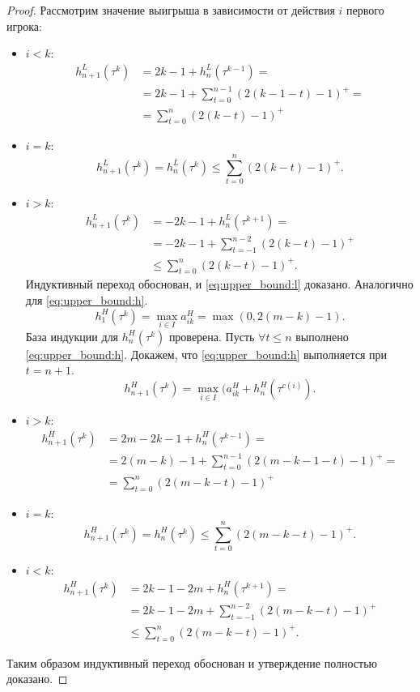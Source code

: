 \begin{proof}
Рассмотрим значение выигрыша в зависимости от действия $ i $ первого игрока:
\begin{itemize}
\item
    $ i < k $:
    \begin{align*}
    h_{n+1}^L(\tau^k) &= 2k - 1 + h_n^L(\tau^{k-1}) = \\
    &= 2k - 1 + \sum_{t = 0}^{n-1}(2(k-1-t)-1)^+ = \\
    &= \sum_{t = 0}^n (2(k-t) - 1)^+
    \end{align*}
\item
    $ i = k $:
    \[
    h_{n+1}^L(\tau^k) = h_n^L(\tau^k) \leq \sum_{t=0}^n(2(k-t)-1)^+.
    \]
\item
    $ i > k $:
    \begin{align*}
    h_{n+1}^L(\tau^k) &= -2k - 1 + h_n^L(\tau^{k+1}) = \\
    &= -2k - 1 + \sum_{t = -1}^{n-2} (2(k-t)-1)^+ \\
    &\leq \sum_{t=0}^n(2(k-t)-1)^+.
    \end{align*}
    Индуктивный переход обоснован, и \eqref{eq:upper_bound:l} доказано.
    Аналогично для \eqref{eq:upper_bound:h}.
    \[
    h_1^H(\tau^k) = \max_{i \in I} a_{ik}^H = \max(0, 2(m - k) - 1).
    \]
    База индукции для $ h_n^H(\tau^k) $ проверена.
    Пусть $ \forall t \leq n $ выполнено \eqref{eq:upper_bound:h}. Докажем, что \eqref{eq:upper_bound:h} выполняется при $ t = n + 1 $.
    \[
    h_{n+1}^H(\tau^k) = \max_{i \in I}(a_{ik}^H + h_n^H(\tau^{c(i)}).
    \]
\item
    $ i > k $:
    \begin{align*}
    h_{n+1}^H(\tau^k) &= 2m - 2k - 1 + h_n^H(\tau^{k-1}) = \\
    &= 2(m-k)- 1 + \sum_{t = 0}^{n-1}(2(m-k-1-t)-1)^+ = \\
    &= \sum_{t = 0}^n (2(m-k-t) - 1)^+
    \end{align*}
\item
    $ i = k $:
    \[
    h_{n+1}^H(\tau^k) = h_n^H(\tau^k) \leq \sum_{t=0}^n(2(m-k-t)-1)^+.
    \]
\item
    $ i < k $:
    \begin{align*}
    h_{n+1}^H(\tau^k) &= 2k - 1 - 2m + h_n^H(\tau^{k+1}) = \\
    &= 2k - 1 - 2m + \sum_{t = -1}^{n-2} (2(m-k-t)-1)^+ \\
    &\leq \sum_{t=0}^n(2(m-k-t)-1)^+.
    \end{align*}
\end{itemize}

Таким образом индуктивный переход обоснован и утверждение полностью доказано.
\end{proof}

